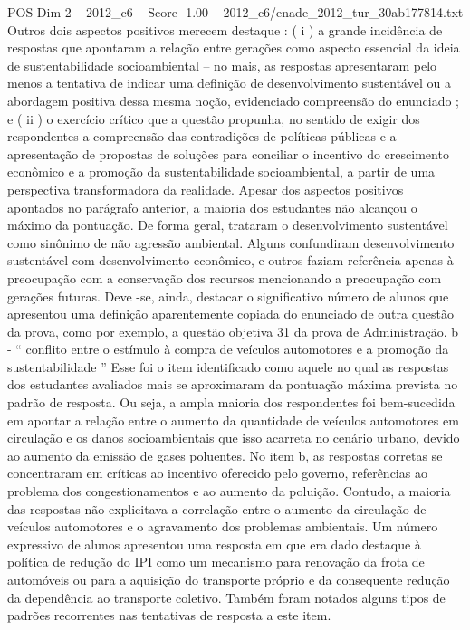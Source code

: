 \begin{textsample}{POS Dim 2 – 2012\_c6 – Score -1.00 – 2012\_c6/enade\_2012\_tur\_30ab177814.txt}
Outros dois aspectos positivos merecem destaque : ( i ) a grande incidência de respostas que apontaram a relação entre gerações como aspecto essencial da ideia de sustentabilidade socioambiental – no mais, as respostas apresentaram pelo menos a tentativa de indicar uma definição de desenvolvimento sustentável ou a abordagem positiva dessa mesma noção, evidenciado compreensão do enunciado ; e ( ii ) o exercício crítico que a questão propunha, no sentido de exigir dos respondentes a compreensão das contradições de políticas públicas e a apresentação de propostas de soluções para conciliar o incentivo do crescimento econômico e a promoção da sustentabilidade socioambiental, a partir de uma perspectiva transformadora da realidade.
Apesar dos aspectos positivos apontados no parágrafo anterior, a maioria dos estudantes não alcançou o máximo da pontuação.
De forma geral, trataram o desenvolvimento sustentável como sinônimo de não agressão ambiental.
Alguns confundiram desenvolvimento sustentável com desenvolvimento econômico, e outros faziam referência apenas à preocupação com a conservação dos recursos mencionando a preocupação com gerações futuras.
Deve -se, ainda, destacar o significativo número de alunos que apresentou uma definição aparentemente copiada do enunciado de outra questão da prova, como por exemplo, a questão objetiva 31 da prova de Administração. b - “ conflito entre o estímulo à compra de veículos automotores e a promoção da sustentabilidade ” Esse foi o item identificado como aquele no qual as respostas dos estudantes avaliados mais se aproximaram da pontuação máxima prevista no padrão de resposta.
Ou seja, a ampla maioria dos respondentes foi bem-sucedida em apontar a relação entre o aumento da quantidade de veículos automotores em circulação e os danos socioambientais que isso acarreta no cenário urbano, devido ao aumento da emissão de gases poluentes.
No item b, as respostas corretas se concentraram em críticas ao incentivo oferecido pelo governo, referências ao problema dos congestionamentos e ao aumento da poluição.
Contudo, a maioria das respostas não explicitava a correlação entre o aumento da circulação de veículos automotores e o agravamento dos problemas ambientais.
Um número expressivo de alunos apresentou uma resposta em que era dado destaque à política de redução do IPI como um mecanismo para renovação da frota de automóveis ou para a aquisição do transporte próprio e da consequente redução da dependência ao transporte coletivo.
Também foram notados alguns tipos de padrões recorrentes nas tentativas de resposta a este item.

\end{textsample}
